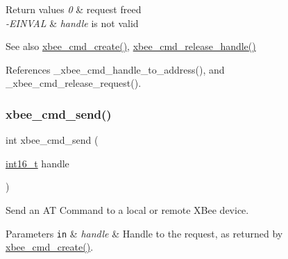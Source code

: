 \begin{DoxyRetVals}{Return values}
{\em 0} & request freed \\
\hline
{\em -\/\+E\+I\+N\+V\+AL} & {\itshape handle} is not valid\\
\hline
\end{DoxyRetVals}
\begin{DoxySeeAlso}{See also}
\hyperlink{group__xbee__atcmd_gab73aaf873be6f9e515dcd65748a7f21c}{xbee\+\_\+cmd\+\_\+create()}, \hyperlink{group__xbee__atcmd_ga91641619ae34da34615193962ffd1525}{xbee\+\_\+cmd\+\_\+release\+\_\+handle()} 
\end{DoxySeeAlso}


References \+\_\+xbee\+\_\+cmd\+\_\+handle\+\_\+to\+\_\+address(), and \+\_\+xbee\+\_\+cmd\+\_\+release\+\_\+request().

\mbox{\label{group__xbee__atcmd_ga2c58eedef60b41dd30ae1f6b475606a8}} 
\subsubsection{\texorpdfstring{xbee\+\_\+cmd\+\_\+send()}{xbee\_cmd\_send()}}
{\footnotesize\ttfamily int xbee\+\_\+cmd\+\_\+send (\begin{DoxyParamCaption}\item[{\hyperlink{group__hal__dos_ga2140805d08462d474b82ddc8d1c2f3e6}{int16\+\_\+t}}]{handle }\end{DoxyParamCaption})}



Send an AT Command to a local or remote X\+Bee device. 


\begin{DoxyParams}[1]{Parameters}
\mbox{\tt in}  & {\em handle} & Handle to the request, as returned by \hyperlink{group__xbee__atcmd_gab73aaf873be6f9e515dcd65748a7f21c}{xbee\+\_\+cmd\+\_\+create()}.\\
\hline
\end{DoxyParams}

